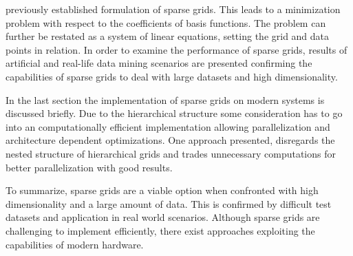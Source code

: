 \documentclass[a4paper]{scrartcl}
\begin{document}
previously established formulation of sparse grids. This leads to a
minimization problem with respect to the coefficients of basis functions.
The
problem can further
be restated as a system of linear equations, setting the grid and
data points in relation.
In order to examine
the performance of sparse grids, results of artificial and
real-life data mining scenarios are presented confirming the capabilities of
sparse grids to deal with large datasets and high dimensionality.
\par
In the last section the implementation of sparse grids on modern
systems is discussed briefly. Due to the hierarchical structure some
consideration has to go into an computationally efficient
implementation allowing
parallelization and architecture dependent optimizations.
One approach presented, disregards the nested structure of hierarchical grids
and trades unnecessary computations for better parallelization with good
results.
\par
To summarize, sparse grids are a viable option when confronted with
high dimensionality and a large amount of data. This is confirmed by
difficult test datasets and application in real world scenarios. Although
sparse grids are challenging to implement efficiently, there exist approaches
exploiting the capabilities of modern hardware.
\end{document}
